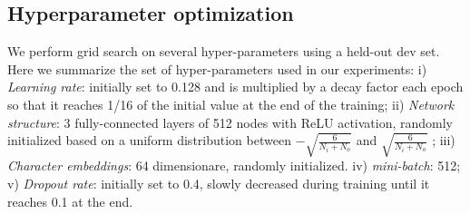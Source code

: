 \documentclass[11pt,a4paper]{article}
\begin{document}

%

\subsection{Hyperparameter optimization}

We perform grid search on several hyper-parameters using a held-out dev set. Here we summarize the set of hyper-parameters used in our experiments:
i) {\it Learning rate}: initially set to 0.128 and is multiplied by a decay factor each epoch so that it reaches 1/16 of the initial value at the end of the training;
ii) {\it Network structure}: 3 fully-connected layers of 512 nodes with ReLU activation, randomly initialized based on a uniform distribution between $-\sqrt{\frac{6}{N_i + N_o}}$  and $\sqrt{\frac{6}{N_i + N_o}}$ \cite{glorot2011deep};
iii) {\it Character embeddings}: 64 dimensionare, randomly initialized.
iv) {\it mini-batch}: 512;
v) {\it Dropout rate}: initially set to 0.4, slowly decreased during training until it reaches 0.1 at the end.

\end{document}
